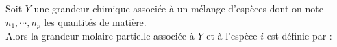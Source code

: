 ﻿\documentclass[a4paper]{article}
\begin{document}
\pagestyle{fancy}
\fancyhf{}
\setlength{\headheight}{15pt}

\begin{center}
	\large{}
\end{center}


Soit \(Y\) une grandeur chimique associée à un mélange d'espèces dont on note \(n_1,\cdots,n_p\) les quantités de matière. \\
Alors la grandeur molaire partielle associée à \(Y\) et à l'espèce \(i\) est définie par :
\begin{center}
\end{center}
\end{document}
